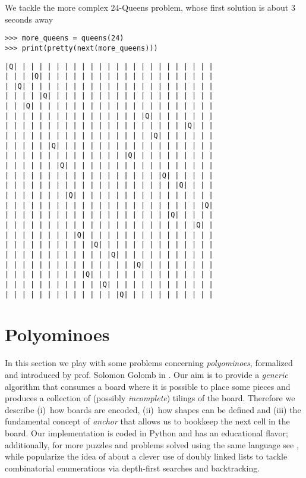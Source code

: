 \begin{example}
We tackle the more complex $24$-Queens problem, whose first solution is about
$3$ seconds away 
\begin{verbatim}
>>> more_queens = queens(24)
>>> print(pretty(next(more_queens)))
\end{verbatim}
\vfill
\begin{Verbatim}[baselinestretch=0.1]
|Q| | | | | | | | | | | | | | | | | | | | | | | |
| | | |Q| | | | | | | | | | | | | | | | | | | | |
| |Q| | | | | | | | | | | | | | | | | | | | | | |
| | | | |Q| | | | | | | | | | | | | | | | | | | |
| | |Q| | | | | | | | | | | | | | | | | | | | | |
| | | | | | | | | | | | | | | | |Q| | | | | | | |
| | | | | | | | | | | | | | | | | | | | | |Q| | |
| | | | | | | | | | | | | | | | | |Q| | | | | | |
| | | | | |Q| | | | | | | | | | | | | | | | | | |
| | | | | | | | | | | | | | |Q| | | | | | | | | |
| | | | | | |Q| | | | | | | | | | | | | | | | | |
| | | | | | | | | | | | | | | | | | |Q| | | | | |
| | | | | | | | | | | | | | | | | | | | |Q| | | |
| | | | | | | |Q| | | | | | | | | | | | | | | | |
| | | | | | | | | | | | | | | | | | | | | | | |Q|
| | | | | | | | | | | | | | | | | | | |Q| | | | |
| | | | | | | | | | | | | | | | | | | | | | |Q| |
| | | | | | | | |Q| | | | | | | | | | | | | | | |
| | | | | | | | | | |Q| | | | | | | | | | | | | |
| | | | | | | | | | | | |Q| | | | | | | | | | | |
| | | | | | | | | | | | | | | |Q| | | | | | | | |
| | | | | | | | | |Q| | | | | | | | | | | | | | |
| | | | | | | | | | | |Q| | | | | | | | | | | | |
| | | | | | | | | | | | | |Q| | | | | | | | | | |
\end{Verbatim}
\end{example}

\section{Polyominoes}

In this section we play with some problems concerning \textit{polyominoes},
formalized and introduced by prof. Solomon Golomb in \citep{Golomb:1996}.  Our
aim is to provide a \textit{generic} algorithm that consumes a board where it
is possible to place some pieces and produces a collection of (possibly
\textit{incomplete}) tilings of the board. Therefore we describe (i)~how boards
are encoded, (ii)~how shapes can be defined and (iii) the fundamental concept
of \textit{anchor} that allows us to bookkeep the next  cell in the
board. Our implementation is coded in Python and has an educational flavor;
additionally, for more puzzles and problems solved using the same language see
\citep{Goodger:polyominoes}, while \citep{knuth:dancing:links} popularize the
idea of \citep{HITOTUMATU1979174} about a clever use of doubly linked lists to
tackle combinatorial enumerations via depth-first searches and backtracking.

